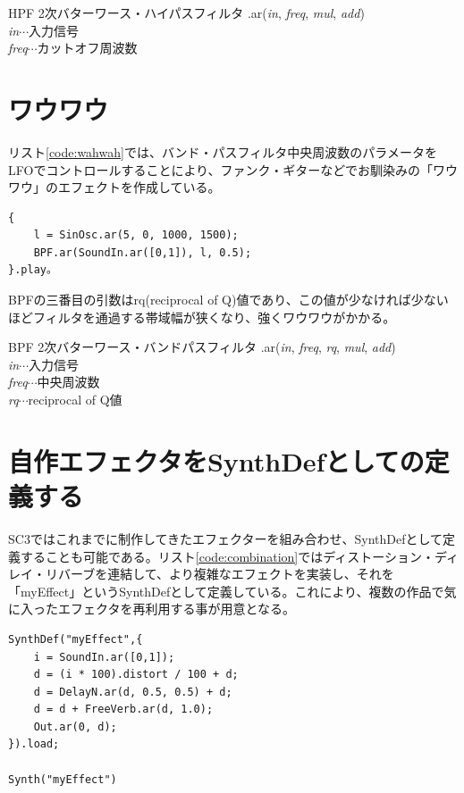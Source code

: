 \documentclass{jsarticle}
\begin{document}
\begin{itembox}[l]{HPF}
{\footnotesize 
2次バターワース・ハイパスフィルタ
.ar({\it in}, {\it freq}, {\it mul}, {\it add})\\

{\it in}$\cdots$入力信号\\
{\it freq}$\cdots$カットオフ周波数\\
}
\end{itembox}

\section{ワウワウ}
リスト\ref{code:wahwah}では、バンド・パスフィルタ中央周波数のパラメータをLFOでコントロールすることにより、ファンク・ギターなどでお馴染みの「ワウワウ」のエフェクトを作成している。
\begin{lstlisting}[caption=ワウワウ, label=code:wahwah]
{
	l = SinOsc.ar(5, 0, 1000, 1500);
	BPF.ar(SoundIn.ar([0,1]), l, 0.5);
}.play。
\end{lstlisting}

BPFの三番目の引数はrq(reciprocal of Q)値であり、この値が少なければ少ないほどフィルタを通過する帯域幅が狭くなり、強くワウワウがかかる。

\begin{itembox}[l]{BPF}
{\footnotesize 
2次バターワース・バンドパスフィルタ
.ar({\it in}, {\it freq}, {\it rq}, {\it mul}, {\it add})\\

{\it in}$\cdots$入力信号\\
{\it freq}$\cdots$中央周波数\\
{\it rq}$\cdots$reciprocal of Q値\\
}
\end{itembox}

\section{自作エフェクタをSynthDefとしての定義する}
SC3ではこれまでに制作してきたエフェクターを組み合わせ、SynthDefとして定義することも可能である。リスト\ref{code:combination}ではディストーション・ディレイ・リバーブを連結して、より複雑なエフェクトを実装し、それを「myEffect」というSynthDefとして定義している。これにより、複数の作品で気に入ったエフェクタを再利用する事が用意となる。

\begin{lstlisting}[caption=エフェクトの組み合わせ, label=code:combination]
SynthDef("myEffect",{
	i = SoundIn.ar([0,1]);
	d = (i * 100).distort / 100 + d;
	d = DelayN.ar(d, 0.5, 0.5) + d;
	d = d + FreeVerb.ar(d, 1.0);
	Out.ar(0, d);
}).load;

Synth("myEffect")
\end{lstlisting}
\end{document}
